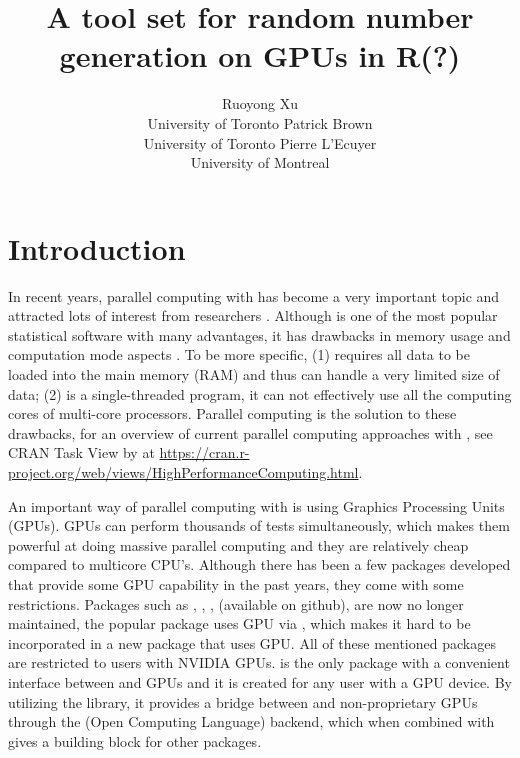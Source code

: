 \documentclass[article,nojss]{jss}\usepackage[]{graphicx}\usepackage[]{color}
\author{Ruoyong Xu\\University of Toronto
   \And Patrick Brown\\University of Toronto
   \And Pierre L’Ecuyer\\University of Montreal}
\title{A tool set for random number generation on GPUs in R(?)}
\begin{document}




\section[Introduction]{Introduction}

\begin{leftbar}
% 

In recent years, parallel computing with  \citep{r2021} has become a very important topic and attracted lots of interest from researchers \citep[see][for a review]{eddelbuettel2021parallel}. Although  is one of the most popular statistical software with many advantages, it has drawbacks in memory usage and computation mode aspects \citep{zhao_2016}. To be more specific, (1)  requires all data to be loaded into the main memory (RAM) and thus can handle a very limited size of data; (2)  is a single-threaded program, it can not effectively use all the computing cores of multi-core processors. Parallel computing is the solution to these drawbacks, for an overview of current parallel computing approaches with , see CRAN Task View by \citet{cran2021} at \url{https://cran.r-project.org/web/views/HighPerformanceComputing.html}. 

An important way of parallel computing with  is using Graphics Processing Units (GPUs). GPUs can perform thousands of tests simultaneously, which makes them powerful at doing massive parallel computing and they are relatively cheap compared to multicore CPU's. Although there has been a few  packages developed that provide some GPU capability in the past years, they come with some restrictions. Packages such as , , ,  (available on github), are now no longer maintained, the popular  \citep{tensorflow1} package uses GPU via , which makes it hard to be incorporated in a new  package that uses GPU. All of these mentioned packages are restricted to  users with NVIDIA GPUs.  \citep{gpur1} is the only  package with a convenient interface between  and GPUs and it is created for any  user with a GPU device. By utilizing the  \citep*{rupp2016viennacl} library, it provides a bridge between  and non-proprietary GPUs through the  (Open Computing Language) backend, which when combined with  \citep{rcpp1} gives a building block for other  packages. 


\end{leftbar}
\end{document}
